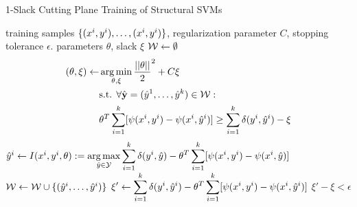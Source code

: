 \begin{algorithm*}[t]
    \caption{1-Slack Cutting Plane Training of Structural SVMs \label{alg_one_slack}}
    \begin{algorithmic}[1]
        \Require training samples $\{ (x^{i}, y^{i}), \dots, (x^{i}, y^{i})\}$, regularization parameter $C$, stopping tolerance $\epsilon$.
        \Ensure parameters $\theta$, slack $\xi$
        \State $\mathcal{W} \leftarrow \emptyset$
        \Repeat
            \State 
            \vspace{-5mm}
            \begin{align*}
            (\theta, \xi) \leftarrow \displaystyle &\operatorname*{arg\,min}_{\theta, \xi} \frac{||\theta||}{2}^2 + C \xi\\
            &\text{s.t. }\forall \hat{\mathbf{y}}=(\hat{y}^{1}, \dots, \hat{y}^{k}) \in \mathcal{W}:\\
            &\theta^T \sum_{i=1}^k [\psi(x^{i}, y^{i}) - \psi(x^{i}, \hat{y}^{i})] \geq \sum_{i=1}^k \delta(y^{i}, \hat{y}^{i}) - \xi
            \end{align*}
                \State
                $\hat{y}^{i} \leftarrow I(x^{i}, y^{i}, \theta) := \displaystyle \operatorname*{arg\,max}_{\hat{y}\in\mathcal{Y}} \sum_{i=1}^k \delta(y^{i}, \hat{y}) - \theta^T \sum_{i=1}^k [\psi(x^{i}, y^{i}) - \psi(x^{i}, \hat{y})]$ \label{get_cutting_plane}
            \EndFor
            \State $\mathcal{W} \leftarrow \mathcal{W} \cup \{ (\hat{y}^{i}, \dots, \hat{y}^{i}) \} $
            \State $ \displaystyle \xi' \leftarrow  \sum_{i=1}^k \delta(y^{i}, \hat{y}^{i}) - \theta^T \sum_{i=1}^k [\psi(x^{i}, y^{i}) - \psi(x^{i}, \hat{y}^{i})] $
        \Until $\xi' - \xi < \epsilon$ \label{convergence_check}
    \end{algorithmic}
\end{algorithm*}

